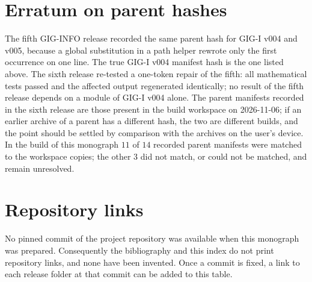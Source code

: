 \section{Erratum on parent hashes}
The fifth GIG-INFO release recorded the same parent hash for GIG-I v004 and v005, because a global substitution in a path helper rewrote only the first occurrence on one line. The true GIG-I v004 manifest hash is the one listed above. The sixth release re-tested a one-token repair of the fifth: all mathematical tests passed and the affected output regenerated identically; no result of the fifth release depends on a module of GIG-I v004 alone. The parent manifests recorded in the sixth release are those present in the build workspace on 2026-11-06; if an earlier archive of a parent has a different hash, the two are different builds, and the point should be settled by comparison with the archives on the user's device. In the build of this monograph $11$ of $14$ recorded parent manifests were matched to the workspace copies; the other $3$ did not match, or could not be matched, and remain unresolved.

\section{Repository links}
No pinned commit of the project repository was available when this monograph was prepared. Consequently the bibliography and this index do not print repository links, and none have been invented. Once a commit is fixed, a link to each release folder at that commit can be added to this table.

